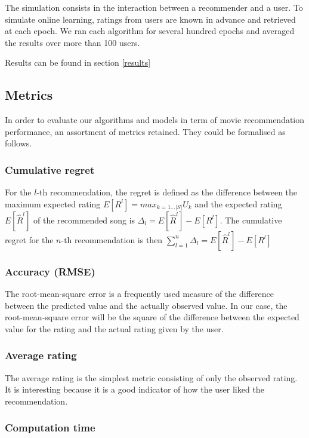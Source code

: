 \documentclass[letterpaper]{article}
\begin{document}
The simulation consists in the interaction between a recommender and a user. To simulate online learning, ratings from users are known in advance and retrieved at each epoch. 
We ran each algorithm for several hundred epochs and averaged the results over more than 100 users. 

Results can be found in section \ref{results} 

\subsection{Metrics} \label{metrics}

In order to evaluate our algorithms and models in term of movie recommendation performance, an assortment of metrics retained. They could be formalised as follows.

\subsubsection{Cumulative regret}

For the $l$-th recommendation, the regret is defined as the difference between the maximum expected rating $ E[R^{l}] = max_{k=1...|S|} U_{k} $  and the expected rating $E[\hat R^{l}]$ of the recommended song is  $\Delta_{l} = E[\hat{R} ^{l}] - E[R^{l}]$. The cumulative regret for the $n$-th recommendation is then $ \sum_{l=1}^{n} \Delta_{l} = E[\hat{R} ^{l}] - E[R^{l}]$

\subsubsection{Accuracy (RMSE)}

The root-mean-square error is a frequently used measure of the difference between the predicted value and the actually observed value. In our case, the root-mean-square error will be the square of the difference between the expected value for the rating and the actual rating given by the user.

\subsubsection{Average rating}

The average rating is the simplest metric consisting of only the observed rating. It is interesting because it is a good indicator of how the user liked the recommendation.

\subsubsection{Computation time}
\end{document}
